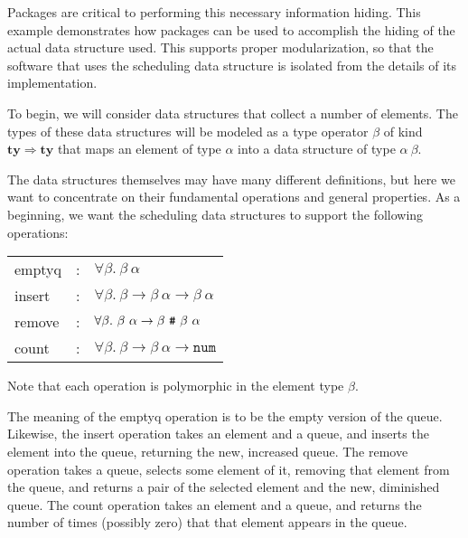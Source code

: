 Packages are critical to performing this necessary information hiding.
This example demonstrates how packages can be used to accomplish
the hiding of the actual data structure used. This supports 
proper modularization,
so that the software that uses the scheduling data structure is
isolated from the details of its implementation.


To begin, we will consider data structures that collect a number
of elements. The types of these data structures will be modeled 
as a type operator $\beta$ of kind $\mathbf{ty} \Rightarrow \mathbf{ty}$
that maps an element of type $\alpha$ into a data structure of
type $\alpha\ \beta$.

The data structures themselves may have many different definitions,
but here we want to concentrate on their fundamental operations and
general properties. As a beginning, we want the scheduling
data structures to support the following operations:
%
\begin{center}
\begin{tabular}{|lcl|}
\hline
emptyq & : & $\forall\beta.\ \beta\ \alpha$ \\
insert & : & $\forall\beta.\ \beta \rightarrow \beta\ \alpha \rightarrow \beta\ \alpha$ \\
remove & : & $\forall\beta.\ \beta\ \alpha \rightarrow \beta\ \mbox{\tt \#}\ \beta\ \alpha$ \\
count  & : & $\forall\beta.\ \beta \rightarrow \beta\ \alpha \rightarrow \mathtt{num}$ \\
\hline
\end{tabular}
\end{center}
%
Note that each operation is polymorphic in the element type $\beta$.

The meaning of the emptyq operation is to be the empty version of the queue.
Likewise, the insert operation takes an element and a queue, and inserts
the element into the queue, returning the new, increased queue.
The remove operation takes a queue, selects some element of it,
removing that element from the queue, and returns a pair of the 
selected element and the new, diminished queue.
The count operation takes an element and a queue, and returns
the number of times (possibly zero) that that element appears
in the queue.

